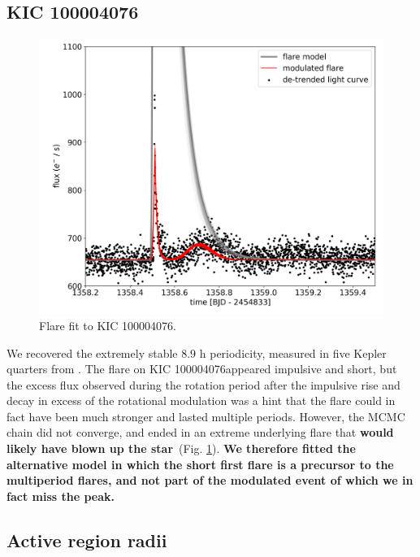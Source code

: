 \documentclass[fleqn,usenatbib,letters]{mnras}%
\newcommand{\FD}{EPIC 212035340} %
\newcommand{\FE}{KIC 100004076} %
\begin{document}
\subsection{\FE}
\begin{figure}
	\includegraphics[width=\columnwidth]{figures/13_12_2019_10_18_KIC100004076_flarefit_50retrievals.png}
    \caption{Flare fit to \FE.}
    \label{fig:fit\FE}
\end{figure}
We recovered the extremely stable 8.9 h periodicity, measured in five Kepler quarters from \citep{gizis2013}. The flare on \FE appeared impulsive and short, but the excess flux observed during the rotation period after the impulsive rise and decay in excess of the rotational modulation was a hint that the flare could in fact have been much stronger and lasted multiple periods. However, the MCMC chain did not converge, and ended in an extreme underlying flare that \textbf{would likely have blown  up the star}~(Fig. \ref{fig:fit\FE}). \textbf{We therefore fitted the alternative model in which the short first flare is a precursor to the multiperiod flares, and not part of the modulated event of which we in fact miss the peak.}

\subsection{Active region radii}
\end{document}
